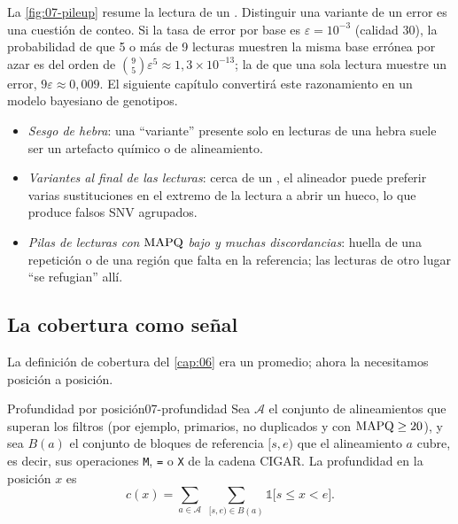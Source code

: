 La \cref{fig:07-pileup} resume la lectura de un . Distinguir una variante de un error es una cuestión de conteo. Si la tasa de error por base es $\varepsilon=10^{-3}$ (calidad 30), la probabilidad de que 5 o más de 9 lecturas muestren la misma base errónea por azar es del orden de $\binom{9}{5}\varepsilon^{5}\approx 1{,}3\times10^{-13}$; la de que una sola lectura muestre un error, $9\varepsilon\approx 0{,}009$. El siguiente capítulo convertirá este razonamiento en un modelo bayesiano de genotipos.

\begin{cuidado}
\begin{itemize}
  \item \emph{Sesgo de hebra}: una ``variante'' presente solo en lecturas de una hebra suele ser un artefacto químico o de alineamiento.
  \item \emph{Variantes al final de las lecturas}: cerca de un , el alineador puede preferir varias sustituciones en el extremo de la lectura a abrir un hueco, lo que produce falsos SNV agrupados.
  \item \emph{Pilas de lecturas con $\operatorname{MAPQ}$ bajo y muchas discordancias}: huella de una repetición o de una región que falta en la referencia; las lecturas de otro lugar ``se refugian'' allí.
\end{itemize}
\end{cuidado}

\subsection{La cobertura como señal}

La definición de cobertura del \cref{cap:06} era un promedio; ahora la necesitamos posición a posición.

\begin{definicion}{Profundidad por posición}{07-profundidad}
Sea $\mathcal{A}$ el conjunto de alineamientos que superan los filtros (por ejemplo, primarios, no duplicados y con $\operatorname{MAPQ}\ge 20$), y sea $B(a)$ el conjunto de bloques de referencia $[s,e)$ que el alineamiento $a$ cubre, es decir, sus operaciones \texttt{M}, \texttt{=} o \texttt{X} de la cadena CIGAR. La profundidad en la posición $x$ es
\begin{equation}\label{eq:07-profundidad}
c(x) = \sum_{a\in\mathcal{A}}\;\sum_{[s,e)\in B(a)} \mathbb{1}\big[s\le x<e\big].
\end{equation}
\end{definicion}

